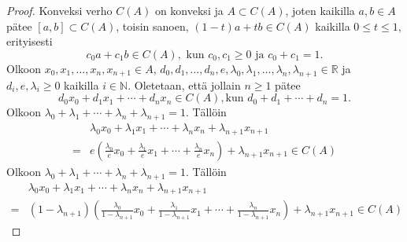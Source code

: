 \documentclass[12pt,a4paper,leqno]{report}
\newcommand{\R}{\mathbb{R}}
\newcommand{\N}{\mathbb{N}}
\theoremstyle{plain}
\theoremstyle{definition}
\theoremstyle{remark}
\begin{document}
\begin{proof}
Konveksi verho $C(A)$ on konveksi ja $A\subset C(A)$, 
joten kaikilla $a,b\in A$ pätee $[a,b]\subset C(A)$, 
toisin sanoen, $(1-t)a+tb\in C(A)$ kaikilla $0\leq t \leq 1$, 
erityisesti 
\begin{equation}\label{konvsis}
c_0 a+c_1 b \in C(A),\text{ kun }c_0,c_1\geq 0\text{ ja }c_0 +c_1=1.
\end{equation}
Olkoon $x_0,x_1,\dots, x_n, x_{n+1} \in A$, 
$d_0,d_1,\dots, d_n,e, \lambda_0 ,\lambda_1,\dots,\lambda_{n},\lambda_{n+1} \in \R$ 
ja $d_i,e, \lambda_{i}\geq 0$ kaikilla $ i\in\N$. 
Oletetaan, että jollain $n\geq 1$ pätee 
\begin{equation*}
d_0 x_0+d_1 x_1+\cdots+d_{n} x_{n}\in C(A), \text{kun } d_0+d_1+\cdots+ d_{n} =1.
 \end{equation*}
%
%
%
%
Olkoon $\lambda_0+\lambda_1+\cdots+ \lambda_{n}+ \lambda_{n+1} =1$. Tällöin
\begin{equation*}
\begin{split}
&\lambda_0 x_0+\lambda_1 x_1+\cdots+\lambda_{n} x_{n}+\lambda_{n+1} x_{n+1}\\
=&e\left(\frac{ \lambda_0}{e} x_0+\frac{ \lambda_1}{e} x_1+\cdots+\frac{ \lambda_n}{e} x_{n}\right) +\lambda_{n+1} x_{n+1}\in C(A)
\end{split}
\end{equation*}
%
%
%
Olkoon $\lambda_0+\lambda_1+\cdots+ \lambda_{n}+ \lambda_{n+1} =1$. Tällöin
\begin{equation*}
\begin{split}
&\lambda_0 x_0+\lambda_1 x_1+\cdots+\lambda_{n} x_{n}+\lambda_{n+1} x_{n+1}\\
=&(1-\lambda_{n+1})\left(\frac{ \lambda_0}{1-\lambda_{n+1}} x_0+\frac{ \lambda_1}{1-\lambda_{n+1}} x_1+\cdots+\frac{ \lambda_n}{1-\lambda_{n+1}} x_{n}\right) +\lambda_{n+1} x_{n+1}\in C(A)
\end{split}

\end{equation*}
\end{proof}
\end{document}
